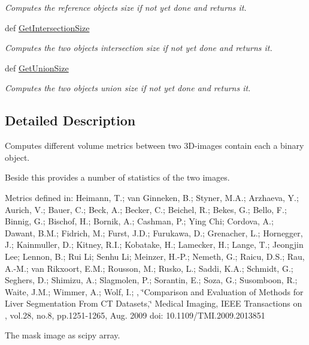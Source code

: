 \begin{DoxyCompactItemize}
\begin{DoxyCompactList}\small\item\em Computes the reference objects size if not yet done and returns it. \end{DoxyCompactList}\item 
\hypertarget{classmedpy_1_1metric_1_1Volume_1_1Volume_a675fe69a77ee67b93da82af7f138deaa}{
def \hyperlink{classmedpy_1_1metric_1_1Volume_1_1Volume_a675fe69a77ee67b93da82af7f138deaa}{GetIntersectionSize}}
\label{classmedpy_1_1metric_1_1Volume_1_1Volume_a675fe69a77ee67b93da82af7f138deaa}

\begin{DoxyCompactList}\small\item\em Computes the two objects intersection size if not yet done and returns it. \end{DoxyCompactList}\item 
\hypertarget{classmedpy_1_1metric_1_1Volume_1_1Volume_a2ba55a81e112ad5b40fc7d8f58e71f0d}{
def \hyperlink{classmedpy_1_1metric_1_1Volume_1_1Volume_a2ba55a81e112ad5b40fc7d8f58e71f0d}{GetUnionSize}}
\label{classmedpy_1_1metric_1_1Volume_1_1Volume_a2ba55a81e112ad5b40fc7d8f58e71f0d}

\begin{DoxyCompactList}\small\item\em Computes the two objects union size if not yet done and returns it. \end{DoxyCompactList}\end{DoxyCompactItemize}


\subsection{Detailed Description}
Computes different volume metrics between two 3D-\/images contain each a binary object. 

Beside this provides a number of statistics of the two images.

Metrics defined in: Heimann, T.; van Ginneken, B.; Styner, M.A.; Arzhaeva, Y.; Aurich, V.; Bauer, C.; Beck, A.; Becker, C.; Beichel, R.; Bekes, G.; Bello, F.; Binnig, G.; Bischof, H.; Bornik, A.; Cashman, P.; Ying Chi; Cordova, A.; Dawant, B.M.; Fidrich, M.; Furst, J.D.; Furukawa, D.; Grenacher, L.; Hornegger, J.; Kainmuller, D.; Kitney, R.I.; Kobatake, H.; Lamecker, H.; Lange, T.; Jeongjin Lee; Lennon, B.; Rui Li; Senhu Li; Meinzer, H.-\/P.; Nemeth, G.; Raicu, D.S.; Rau, A.-\/M.; van Rikxoort, E.M.; Rousson, M.; Rusko, L.; Saddi, K.A.; Schmidt, G.; Seghers, D.; Shimizu, A.; Slagmolen, P.; Sorantin, E.; Soza, G.; Susomboon, R.; Waite, J.M.; Wimmer, A.; Wolf, I.; , \char`\"{}Comparison and Evaluation of Methods for Liver Segmentation From CT Datasets,\char`\"{} Medical Imaging, IEEE Transactions on , vol.28, no.8, pp.1251-\/1265, Aug. 2009 doi: 10.1109/TMI.2009.2013851 \begin{DoxyVerb}The mask image as scipy array.\end{DoxyVerb}
 

